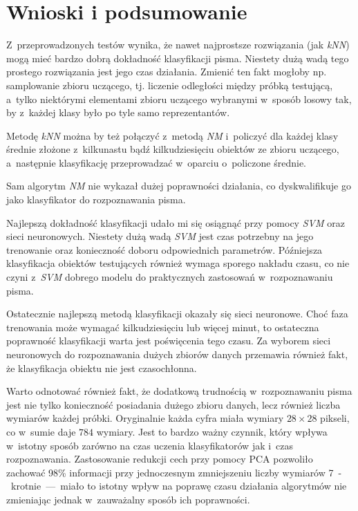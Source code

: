 \documentclass[12pt]{article}
\begin{document}
\section{Wnioski i podsumowanie}
Z~przeprowadzonych testów wynika, że nawet najprostsze rozwiązania (jak \emph{kNN}) mogą mieć bardzo dobrą dokładność klasyfikacji pisma. Niestety dużą wadą tego prostego rozwiązania jest jego czas działania. Zmienić ten fakt mogłoby np.
samplowanie zbioru uczącego, tj. liczenie odległości między próbką testującą, a~tylko niektórymi elementami zbioru uczącego wybranymi w~sposób losowy tak, by z~każdej klasy było po tyle samo reprezentantów.

Metodę \emph{kNN} można by też połączyć z~metodą \emph{NM} i~policzyć dla każdej klasy średnie złożone z~kilkunastu bądź kilkudziesięciu obiektów ze zbioru uczącego, a~następnie klasyfikację przeprowadzać w~oparciu o~policzone średnie.

Sam algorytm \emph{NM} nie wykazał dużej poprawności działania, co dyskwalifikuje go jako klasyfikator do rozpoznawania pisma.

Najlepszą dokładność klasyfikacji udało mi się osiągnąć przy pomocy \emph{SVM} oraz sieci neuronowych. Niestety dużą wadą \emph{SVM} jest czas potrzebny na jego trenowanie oraz konieczność doboru odpowiednich parametrów. Późniejsza
klasyfikacja obiektów testujących również wymaga sporego nakładu czasu, co nie czyni z~\emph{SVM} dobrego modelu do praktycznych zastosowań w~rozpoznawaniu pisma.

Ostatecznie najlepszą metodą klasyfikacji okazały się sieci neuronowe. Choć faza trenowania może wymagać kilkudziesięciu lub więcej minut, to ostateczna poprawność klasyfikacji warta jest poświęcenia tego czasu. Za wyborem sieci neuronowych 
do rozpoznawania dużych zbiorów danych przemawia również fakt, że klasyfikacja obiektu nie jest czasochłonna.

Warto odnotować również fakt, że dodatkową trudnością w~rozpoznawaniu pisma jest nie tylko konieczność posiadania dużego zbioru danych, lecz również liczba wymiarów każdej próbki. Oryginalnie każda cyfra miała wymiary $28 \times 28$ pikseli,
co w~sumie daje $784$ wymiary. Jest to bardzo ważny czynnik, który wpływa w~istotny sposób zarówno na czas uczenia klasyfikatorów jak i~czas rozpoznawania. Zastosowanie redukcji cech przy pomocy PCA pozwoliło zachować 98\% informacji
przy jednoczesnym zmniejszeniu liczby wymiarów 7~-~krotnie~---~miało to istotny wpływ na poprawę czasu działania algorytmów nie zmieniając jednak w~zauważalny sposób ich poprawności.
\end{document}
